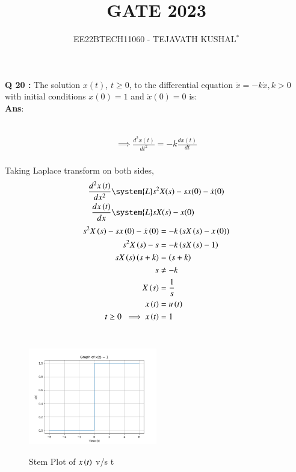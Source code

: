 \documentclass[journal,12pt,twocolumn]{IEEEtran}
\theoremstyle{remark}
\begin{document}

\vspace{3cm}

\title{GATE 2023}
\author{EE22BTECH11060 - TEJAVATH KUSHAL$^{*}$%
}
\maketitle
\newpage
\bigskip

\renewcommand{\thefigure}{\theenumi}
\renewcommand{\thetable}{\theenumi}

\maketitle
\noindent \textbf{Q 20 :} The solution \(x(t)\), \(t \geq 0\), to the differential equation
$\ddot{x} = -k\dot{x} , k > 0$
with initial conditions \(x(0) = 1\) and \(\dot{x} (0) = 0\) is: \quad {} \\

\noindent \textbf{Ans}:\\ \\
\begin{table}[h]

\end{table}
\begin{align}
    \implies \frac{d^2 x(t)}{dt^2} = -k\frac{dx(t)}{dt}
\end{align}\\
Taking Laplace transform on both sides,\\
\begin{align}
\label{L(y'')}\frac{d^2x\brak{t}}{dx^2} &\system{L} s^2X(s)-sx(0)-\dot{x}(0)\\
\label{L(y')}\frac{dx\brak{t}}{dx} &\system{L} sX(s)-x(0)
\end{align}
\begin{align}
s^2 X\left(s\right) - sx\left(0\right) - \dot{x}\left(0\right) &= -k\left(sX\left(s\right) - x\left(0\right)\right) \\
s^2 X\left(s\right) - s &= -k\left(sX\left(s\right)-1\right) \\
sX\left(s\right)\left(s+k\right)&=\left(s+k\right)\\
     s &\neq -k\\
     X\left(s\right)&=\frac{1}{s}  \\
     x\left(t\right)&=u\left(t\right)\\
     t\geq 0\ \implies x\left(t\right)&=1
\end{align}\\
\pagebreak
\begin{figure}[h]
    \includegraphics[width=0.5\textwidth]{figs/x(t)_vs_t.png}\label{fig:stem-plot}
    \caption{Stem Plot of $x\left(t\right)$ v/s t}
\end{figure}
\end{document}
